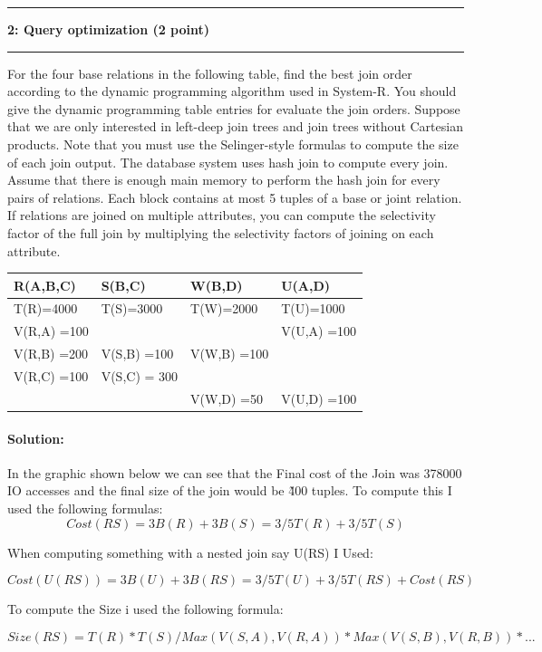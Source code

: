 \documentclass[11pt]{article}
\newcommand\question[2]{\vspace{.25in}\hrule\textbf{#1: #2}\vspace{.5em}\hrule\vspace{.10in}}
\begin{document}
\question{2}{Query optimization  (2 point)}
For the four base relations in the following table, 
find the best join order according to 
the dynamic programming algorithm used in System-R. 
You should give the dynamic programming table entries 
for evaluate the join orders.
Suppose that we are only interested in left-deep join trees and 
join trees without Cartesian products. 
Note that you must use the Selinger-style formulas to compute the size of each join output.
The database system uses hash join to compute every join.
Assume that there is enough main memory to perform the hash join for every pairs of relations.
Each block contains at most 5 tuples of a base or joint relation.
If relations are joined on multiple attributes, you can compute the selectivity factor of the full join by multiplying the 
selectivity factors of joining on each attribute.

		
\begin{tabular}{ |l| l | l|l|}
\hline
  R(A,B,C) & S(B,C) & W(B,D) & U(A,D) \\\hline
  T(R)=4000 & T(S)=3000& T(W)=2000 & T(U)=1000 \\\hline
  V(R,A) =100 &  & & V(U,A) =100\\
  V(R,B) =200 & V(S,B) =100& V(W,B) =100& \\
  V(R,C) =100 & V(S,C) = 300&&\\
  & & V(W,D) =50 & V(U,D) =100\\\hline
\end{tabular}

\paragraph{Solution:} \hfill \break
In the graphic shown below we can see that the Final cost of the Join was 378000 IO accesses and the final size of the join would be \~ 400 tuples. To compute this I used the following formulas:\\

\[ Cost(R S) = 3 B(R) + 3 B(S) = 3/5 T(R) + 3/5 T(S) \]


When computing something with a nested join say U(RS) I Used: \hfill \break

\[ Cost(U(R S)) = 3 B(U) + 3 B(R S) = 3/5 T(U) + 3/5 T(R S) + Cost(R S) \]

To compute the Size i used the following formula: \hfill \break

\[ Size (R S) = T(R) * T(S) / Max(V(S, A), V(R, A)) * Max(V(S, B), V(R, B)) * ...\]
\end{document}
